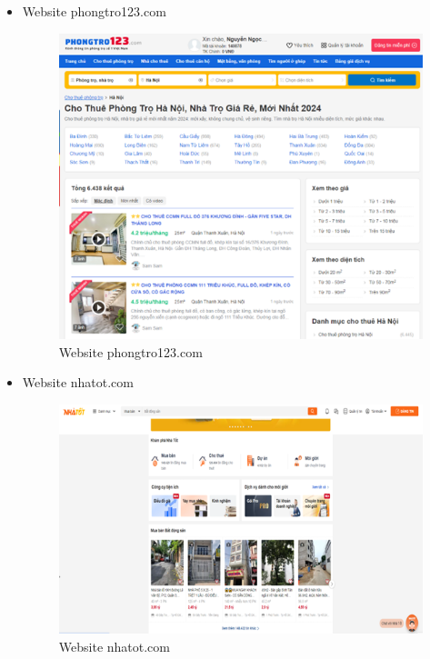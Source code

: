\documentclass[../Main.tex]{subfiles}
\begin{document}
\begin{itemize}
    \item Website phongtro123.com
          \begin{figure}[H]
              \centering
              \includegraphics[width=\textwidth]{Figure/Picture1.png}
              \caption{Website phongtro123.com}
              \label{fig:phongtro123}
          \end{figure}
    \item Website nhatot.com
          \begin{figure}[H]
              \centering
              \includegraphics[width=\textwidth]{Figure/Picture2.png}
              \caption{Website nhatot.com}
              \label{fig:nhatot}
          \end{figure}

\end{itemize}
\end{document}
